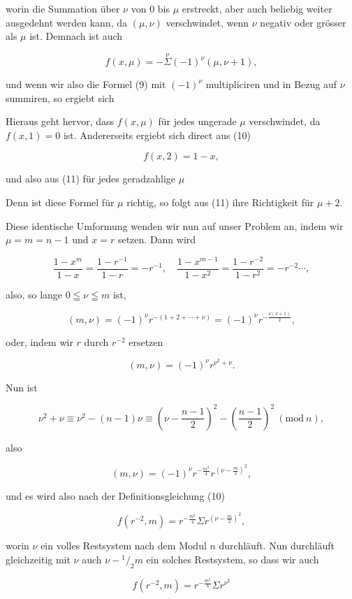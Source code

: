 
worin die Summation über $\nu$ von 0 bis $\mu$ erstreckt, aber auch
beliebig weiter ausgedehnt werden kann, da $(\mu, \nu)$ verschwindet,
wenn $\nu$ negativ oder grösser als $\mu$ ist. Demnach ist auch

\[ f(x, \mu) = -\overset{\nu}{\Sigma} (-1)^{\nu} (\mu, \nu + 1), \]

und wenn wir also die Formel (9) mit $(-1)^{\nu}$ multipliciren und
in Bezug auf $\nu$ summiren, so ergiebt sich


Hieraus geht hervor, dass $f(x, \mu)$ für jedes ungerade $\mu$ verschwindet, da $f(x, 1) = 0$ ist. Andererseits ergiebt sich direct
aus (10)

\[ f(x, 2) = 1 - x, \]

und also aus (11) für jedes geradzahlige $\mu$


Denn ist diese Formel für $\mu$ richtig, so folgt aus (11) ihre
Richtigkeit für $\mu + 2$.

Diese identische Umformung wenden wir nun auf unser
Problem an, indem wir $\mu = m = n - 1$ und $x = r$ setzen. Dann wird

\[ \frac{1 - x^m}{1 - x} = \frac{1 - r^{-1}}{1 - r} = -r^{-1}, \quad \frac{1 - x^{m - 1}}{1 - x^2} = \frac{1 - r^{-2}}{1 - r^2} = -r^{-2} \cdots, \]

also, so lange $0 \leqq \nu \leqq m$ ist,

\[ (m, \nu) = (-1)^{\nu} r^{-(1 + 2 + \cdots + \nu)} = (-1)^{\nu} r^{-\frac{\nu(\nu + 1)}{2}}, \]

oder, indem wir $r$ durch $r^{-2}$ ersetzen

\[ (m, \nu) = (-1)^{\nu} r^{\nu^2 + \nu}. \]

Nun ist

\[ \nu^2 + \nu \equiv \nu^2 - (n - 1) \nu \equiv \left( \nu - \frac{n - 1}{2} \right)^2 - \left( \frac{n - 1}{2} \right)^2 \ (\mathrm{mod}\ n), \]

also

\[ (m, \nu) = (-1)^{\nu} r^{-\frac{m^2}{4}} r^{\left( \nu - \frac{m}{2} \right)^2}, \]

und es wird also nach der Definitionsgleichung (10)

\[ f(r^{-2}, m) = r^{-\frac{m^2}{4}} \Sigma r^{\left( \nu - \frac{m}{2} \right)^2}, \]

worin $\nu$ ein volles Restsystem nach dem Modul $n$ durchläuft.
Nun durchläuft gleichzeitig mit $\nu$ auch $\nu - {}^1/_2 m$ ein solches
Restsystem, so dass wir auch

\[ f(r^{-2}, m) = r^{-\frac{m^2}{4}} \Sigma r^{\nu^2} \]
